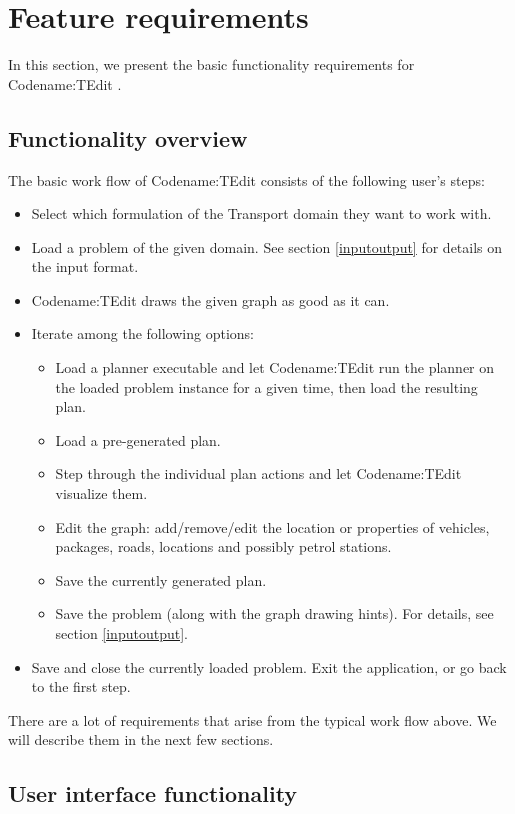 \documentclass[10pt,a4paper,oneside]{article}
\newcommand{\pname}{Codename:TEdit } %
\begin{document}
\section{Feature requirements}

In this section, we present the basic functionality requirements for \pname.

\subsection{Functionality overview}

The basic work flow of \pname consists of the following user's steps:
\begin{itemize}
\item Select which formulation of the Transport domain they want to work with.
\item Load a problem of the given domain. See section \ref{inputoutput} for details on the input format.
\item \pname draws the given graph as good as it can.
\item Iterate among the following options:
\begin{itemize}
\item Load a planner executable and let \pname run the planner on the loaded problem instance for a given time, then load the resulting plan.
\item Load a pre-generated plan.
\item Step through the individual plan actions and let \pname visualize them.
\item Edit the graph: add/remove/edit the location or properties of vehicles, packages, roads, locations and possibly petrol stations.
\item Save the currently generated plan.
\item Save the problem (along with the graph drawing hints). For details, see section \ref{inputoutput}.
\end{itemize}
\item Save and close the currently loaded problem. Exit the application, or go back to the first step.
\end{itemize}

There are a lot of requirements that arise from the typical work flow above. We will describe them in the next few sections.

\subsection{User interface functionality}
\end{document}
